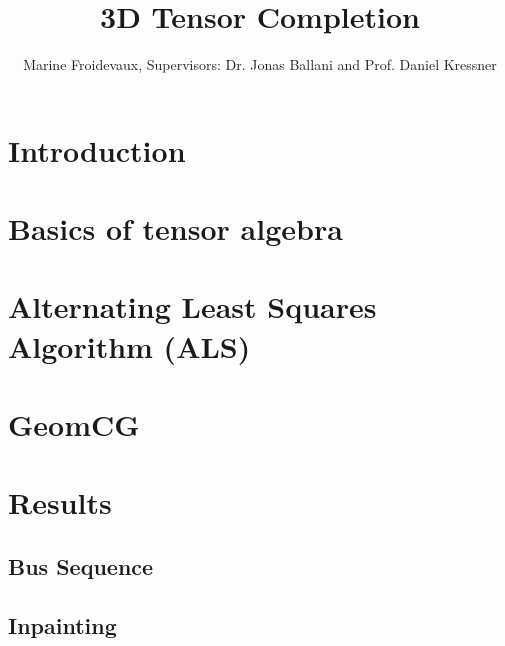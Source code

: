 \documentclass[a4paper, 11pt]{article} %
\newcommand{\mail}[1]{{\href{mailto:#1}{#1}}}
\begin{document}
\title{3D Tensor Completion\\ \textsc{}}
\author{Marine Froidevaux, Supervisors: Dr. Jonas Ballani and Prof. Daniel Kressner }%




\maketitle
%
\thispagestyle{empty}
\setcounter{tocdepth}{2} %
\tableofcontents
\newpage
{}



\section{Introduction}
\section{Basics of tensor algebra}
\section{Alternating Least Squares Algorithm (ALS)}
\section{GeomCG}
\section{Results}
\subsection{Bus Sequence}
\subsection{Inpainting}
\end{document}
